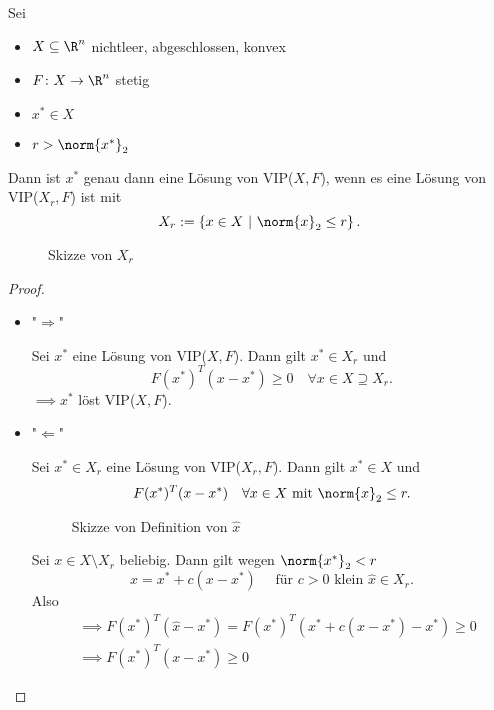 \begin{lemma}
	Sei
	\begin{itemize}
		\item $X \subseteq \R^{n}$ nichtleer, abgeschlossen, konvex
		\item $F \colon X \rightarrow \R^{n} $ stetig
		\item ${x}^{*} \in X$
		\item $r > \norm{{x}^{*}} _{2}$
	\end{itemize}
	Dann ist ${x}^{*}$ genau dann eine Lösung von VIP($X,F$), wenn es eine Lösung von VIP($X_{r},F$) ist mit
	\[
	X_{r}:= \left\{ x \in X ~|~ \norm{x} _{2}\leq  r \right\} 
	.\] 
	\begin{figure}[H]
		\begin{center}
			
		\end{center}
		\caption{Skizze von $X_{r}$}
		\label{fig:XR1}
	\end{figure}
	
\end{lemma}

\begin{proof}
	\begin{itemize}
		\item "$\Longrightarrow$"
	
			Sei ${x}^{*}$ eine Lösung von VIP($X,F$). Dann gilt ${x}^{*} \in X_{r}$ und
			\[
				F({x}^{*})^{T}(x-{x}^{*}) \geq  0 \quad \forall x \in X \supseteq X_{r}
			.\] 
			$\implies {x}^{*}$ löst VIP($X,F$).
	
		\item "$\Longleftarrow$"
	
			Sei ${x}^{*} \in X_{r}$ eine Lösung von VIP($X_{r},F$). Dann gilt ${x}^{*} \in X$ und
			\[
				F({x}^{*})^{T}(x-{x}^{*}) \quad \forall x \in X \text{ mit } \norm{x}_{2}  \leq  r
			.\] 
			\begin{figure}[H]
				\begin{center}
					
				\end{center}
				\caption{Skizze von Definition von $\hat{x}$}
				\label{fig:XR2}
			\end{figure}
			
			Sei $x \in X \setminus  X_{r}$ beliebig. Dann gilt wegen $\norm{{x}^{*}}_{2}< r$
			\[
				\hat{x} = {x}^{*} + c(x-{x}^{*}) \quad \text{ für }c>0 \text{ klein } \hat{x} \in X_{r}
			.\] 
			Also
			\begin{align*}
				&\implies F({x}^{*})^{T}(\hat{x}-{x}^{*}) = F({x}^{*})^{T}({x}^{*} + c (x-{x}^{*}) - {x}^{*}) \geq  0 \\
				&\implies F({x}^{*})^{T}(x-{x}^{*}) \geq  0
			\end{align*}
			
	\end{itemize}
	
\end{proof}

